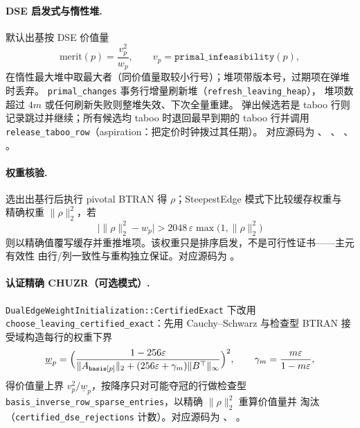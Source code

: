 \paragraph{DSE 启发式与惰性堆.}
默认出基按 DSE 价值量
\begin{equation}
  \mathrm{merit}(p) = \frac{v_p^{2}}{w_p},
  \qquad v_p = \texttt{primal\_infeasibility}(p),
  \label{eq:lpkernel:chuzr-merit}
\end{equation}
在惰性最大堆中取最大者（同价值量取较小行号）；堆项带版本号，过期项在弹堆时丢弃。
\texttt{primal\_changes} 事务行增量刷新堆（\texttt{refresh\_leaving\_heap}），
堆项数超过 $4m$ 或任何刷新失败则整堆失效、下次全量重建。
弹出候选若是 taboo 行则记录跳过并继续；所有候选均 taboo 时退回最早到期的
taboo 行并调用 \texttt{release\_taboo\_row}（aspiration：把定价时钟拨过其任期）。
对应源码为 、
、
、
。

\paragraph{权重核验.}
选出出基行后执行 pivotal BTRAN 得 $\rho$；SteepestEdge 模式下比较缓存权重与
精确权重 $\|\rho\|_2^2$，若
\begin{equation}
  \bigl|\|\rho\|_2^2 - w_p\bigr| > 2048\,\varepsilon \max\bigl(1, \|\rho\|_2^2\bigr)
\end{equation}
则以精确值覆写缓存并重推堆项。该权重只是排序启发，不是可行性证书——主元有效性
由行/列一致性与重构独立保证。对应源码为
。

\paragraph{认证精确 CHUZR（可选模式）.}
\texttt{DualEdgeWeightInitialization::CertifiedExact} 下改用
\texttt{choose\_leaving\_certified\_exact}：先用 Cauchy--Schwarz 与检查型 BTRAN
接受域构造每行的权重下界
\begin{equation}
  \underline{w}_p = \Bigl(\frac{1 - 256\varepsilon}
      {\|A_{\texttt{basis}[p]}\|_2 + (256\varepsilon + \gamma_m)
      \|B^{\top}\|_{\infty}}\Bigr)^{2},
  \qquad \gamma_m = \frac{m\varepsilon}{1 - m\varepsilon},
\end{equation}
得价值量上界 $v_p^2/\underline{w}_p$，按降序只对可能夺冠的行做检查型
\texttt{basis\_inverse\_row\_sparse\_entries}，以精确 $\|\rho\|_2^2$ 重算价值量并
淘汰（\texttt{certified\_dse\_rejections} 计数）。对应源码为
、
。

